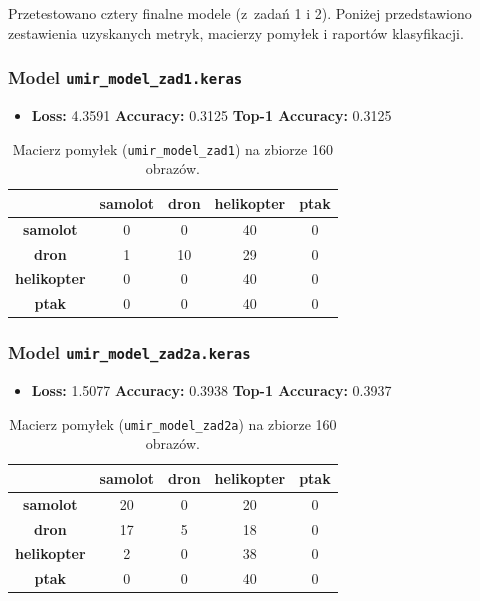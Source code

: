 Przetestowano cztery finalne modele (z~zadań 1 i 2). Poniżej przedstawiono zestawienia uzyskanych metryk, macierzy pomyłek i raportów klasyfikacji.

\subsubsection*{Model \texttt{umir\_model\_zad1.keras}}
\begin{itemize}
    \item \textbf{Loss:} 4.3591 \quad \textbf{Accuracy:} 0.3125 \quad \textbf{Top-1 Accuracy:} 0.3125
\end{itemize}

\begin{table}[H]
\centering
\caption{Macierz pomyłek (\texttt{umir\_model\_zad1}) na zbiorze 160 obrazów.}
\begin{tabular}{c|cccc}
\hline
 & \textbf{samolot} & \textbf{dron} & \textbf{helikopter} & \textbf{ptak} \\ 
\hline
\textbf{samolot}     & 0 & 0 & 40 & 0 \\
\textbf{dron}        & 1 & 10 & 29 & 0 \\
\textbf{helikopter}  & 0 & 0 & 40 & 0 \\
\textbf{ptak}        & 0 & 0 & 40 & 0 \\
\hline
\end{tabular}
\end{table}

\noindent


\subsubsection*{Model \texttt{umir\_model\_zad2a.keras}}
\begin{itemize}
    \item \textbf{Loss:} 1.5077 \quad \textbf{Accuracy:} 0.3938 \quad \textbf{Top-1 Accuracy:} 0.3937
\end{itemize}

\begin{table}[H]
\centering
\caption{Macierz pomyłek (\texttt{umir\_model\_zad2a}) na zbiorze 160 obrazów.}
\begin{tabular}{c|cccc}
\hline
 & \textbf{samolot} & \textbf{dron} & \textbf{helikopter} & \textbf{ptak}\\
\hline
\textbf{samolot}     & 20 &  0 & 20 &  0 \\
\textbf{dron}        & 17 &  5 & 18 &  0 \\
\textbf{helikopter}  &  2 &  0 & 38 &  0 \\
\textbf{ptak}        &  0 &  0 & 40 &  0 \\
\hline
\end{tabular}
\end{table}

